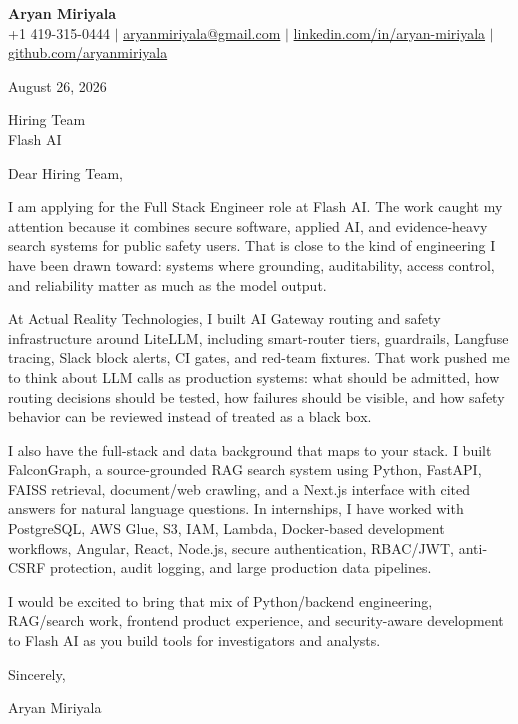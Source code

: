 \documentclass[letterpaper,11pt]{article}
\begin{document}
\begin{center}
  {\Large \textbf{Aryan Miriyala}}\\
  \small
  +1 419-315-0444 $|$
  \href{mailto:aryanmiriyala@gmail.com}{aryanmiriyala@gmail.com} $|$
  \href{https://www.linkedin.com/in/aryan-miriyala-7788a21b6/}{linkedin.com/in/aryan-miriyala} $|$
  \href{https://github.com/aryanmiriyala}{github.com/aryanmiriyala}
\end{center}

\vspace{10pt}

August 26, 2026

Hiring Team\\
Flash AI

Dear Hiring Team,

I am applying for the Full Stack Engineer role at Flash AI. The work caught my attention because it combines secure software, applied AI, and evidence-heavy search systems for public safety users. That is close to the kind of engineering I have been drawn toward: systems where grounding, auditability, access control, and reliability matter as much as the model output.

At Actual Reality Technologies, I built AI Gateway routing and safety infrastructure around LiteLLM, including smart-router tiers, guardrails, Langfuse tracing, Slack block alerts, CI gates, and red-team fixtures. That work pushed me to think about LLM calls as production systems: what should be admitted, how routing decisions should be tested, how failures should be visible, and how safety behavior can be reviewed instead of treated as a black box.

I also have the full-stack and data background that maps to your stack. I built FalconGraph, a source-grounded RAG search system using Python, FastAPI, FAISS retrieval, document/web crawling, and a Next.js interface with cited answers for natural language questions. In internships, I have worked with PostgreSQL, AWS Glue, S3, IAM, Lambda, Docker-based development workflows, Angular, React, Node.js, secure authentication, RBAC/JWT, anti-CSRF protection, audit logging, and large production data pipelines.

I would be excited to bring that mix of Python/backend engineering, RAG/search work, frontend product experience, and security-aware development to Flash AI as you build tools for investigators and analysts.

Sincerely,

Aryan Miriyala
\end{document}
